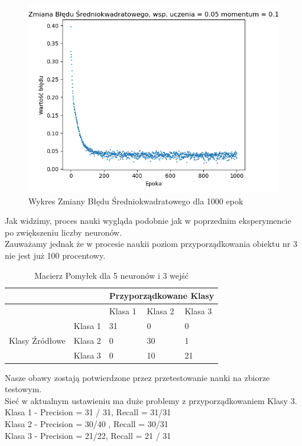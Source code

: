 \documentclass[12pt]{article}
\begin{document}
\newpage

\begin{figure}[!ht]
 \centering
 \includegraphics[width=12cm]{WykresBlad5neuron3wejscia1.png}
 \caption{Wykres Zmiany Błędu Średniokwadratowego dla 1000 epok}
 \vspace{-0.1cm}
 \label{WykresBlad4}
\end{figure}

Jak widzimy, proces nauki wygląda podobnie jak w poprzednim eksperymencie po zwiększeniu liczby neuronów.\\ Zauważamy jednak że w procesie naukii poziom przyporządkowania obiektu nr 3 nie jest już 100 procentowy.
\newpage

\begin{table}
\caption{\label{tab:tablica4} Macierz Pomyłek dla 5 neuronów i 3 wejść }
\begin{tabular}{ |p{3cm}|p{3cm}|p{2cm}|p{2cm}|p{2cm}|  }
 \hline
 & & 
 \multicolumn{3}{|c|}{Przyporządkowane Klasy} \\
 \hline

   & & Klasa 1 & Klasa 2 & Klasa 3\\
 \hline
\multirow{3}{4em}{Klasy Źródłowe}
   & Klasa 1 & 31 & 0 & 0 \\ 
   & Klasa 2 & 0 & 30 & 1 \\
   & Klasa 3 & 0 & 10 & 21 \\

 \hline
\end{tabular}
\end{table}

Nasze obawy zostają potwierdzone przez przetestowanie nauki na zbiorze testowym.\\ Sieć w aktualnym ustawieniu ma duże problemy z przyporządkowaniem Klasy 3.
\\Klasa 1 - Precision = 31 / 31, Recall = 31/31\\
Klasa 2 - Precision = 30/40 , Recall = 30/31\\
Klasa 3 - Precision = 21/22, Recall = 21 / 31\\
\end{document}
